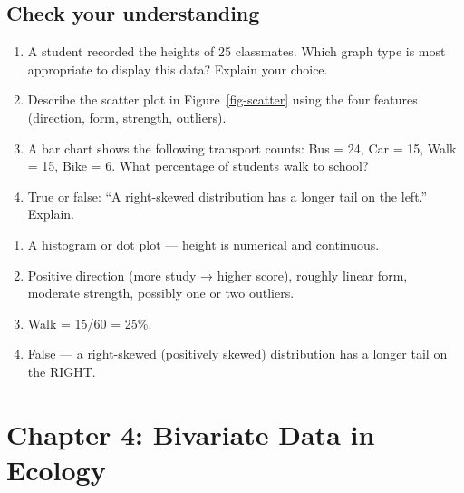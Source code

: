 \documentclass[
  11pt,
  a4paper,
  oneside,
  open=any]{scrbook}
\providecommand{\tightlist}{%
  \setlength{\itemsep}{0pt}\setlength{\parskip}{0pt}}
\begin{document}
\section{Check your understanding}\label{check-your-understanding-2}

\begin{enumerate}
\def\labelenumi{\arabic{enumi}.}
\item
  A student recorded the heights of 25 classmates. Which graph type is
  most appropriate to display this data? Explain your choice.
\item
  Describe the scatter plot in Figure~\ref{fig-scatter} using the four
  features (direction, form, strength, outliers).
\item
  A bar chart shows the following transport counts: Bus = 24, Car = 15,
  Walk = 15, Bike = 6. What percentage of students walk to school?
\item
  True or false: ``A right-skewed distribution has a longer tail on the
  left.'' Explain.
\end{enumerate}

\begin{tcolorbox}[enhanced jigsaw, breakable, leftrule=.75mm, bottomtitle=1mm, bottomrule=.15mm, titlerule=0mm, left=2mm, opacitybacktitle=0.6, coltitle=black, colbacktitle=quarto-callout-note-color!10!white, rightrule=.15mm, title=\textcolor{quarto-callout-note-color}{\faInfo}\hspace{0.5em}{Answers}, toptitle=1mm, arc=.35mm, colback=white, toprule=.15mm, colframe=quarto-callout-note-color-frame, opacityback=0]

\begin{enumerate}
\def\labelenumi{\arabic{enumi}.}
\tightlist
\item
  A histogram or dot plot --- height is numerical and continuous.
\item
  Positive direction (more study → higher score), roughly linear form,
  moderate strength, possibly one or two outliers.
\item
  Walk = 15/60 = 25\%.
\item
  False --- a right-skewed (positively skewed) distribution has a longer
  tail on the RIGHT.
\end{enumerate}

\end{tcolorbox}


\chapter{Chapter 4: Bivariate Data in
Ecology}\label{chapter-4-bivariate-data-in-ecology}
\end{document}
